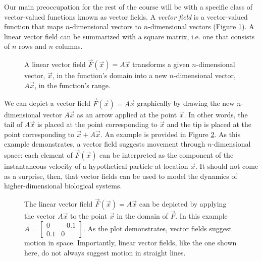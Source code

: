 \documentclass[../book.tex]{subfiles}
\begin{document}
Our main preoccupation for the rest of the course will be with a specific class of vector-valued functions known as vector fields. A \emph{vector field} is a vector-valued function that maps \(n\)-dimensional vectors to \(n\)-dimensional vectors (Figure \ref{fig:mapping}). A linear vector field can be summarized with a square matrix, i.e. one that consists of \(n\) rows and \(n\) columns.

\begin{figure}[htbp]
  \centering
  \caption{A linear vector field \(\vec{F}(\vec{x})=A \vec{x}\) transforms a given \(n\)-dimensional vector, \(\vec{x}\), in the function's domain into a new \(n\)-dimensional vector, \(A \vec{x}\), in the function's range.}
  \label{fig:mapping}
\end{figure}

We can depict a vector field \(\vec{F}(\vec{x}) = A \vec{x}\)  graphically by drawing the new \(n\)-dimensional vector \(A \vec{x}\) as an arrow applied at the point \(\vec{x}\). In other words, the tail of \(A \vec{x}\) is placed at the point corresponding to \(\vec{x}\) and the tip is placed at the point corresponding to \(\vec{x} + A \vec{x}\). An example is provided in Figure \ref{fig:vf}. As this example demonstrates, a vector field suggests movement through \(n\)-dimensional space: each element of \(\vec{F}(\vec{x})\) can be interpreted as the component of the instantaneous velocity of a hypothetical particle at location \(\vec{x}\). It should not come as a surprise, then, that vector fields can be used to model the dynamics of higher-dimensional biological systems.

\begin{figure}[htbp]
  \centering
  \caption{The linear vector field \(\vec{F}(\vec{x}) = A \vec{x}\)  can be depicted by applying the vector \(A \vec{x}\) to the point \(\vec{x}\) in the domain of \(\vec{F}\). In this example \(A = \begin{bmatrix} 0 & -0.1 \\ 0.1 & 0\end{bmatrix}\). As the plot demonstrates, vector fields suggest motion in space. Importantly, linear vector fields, like the one shown here, do not always suggest motion in straight lines.}
  \label{fig:vf}
\end{figure}
\end{document}
